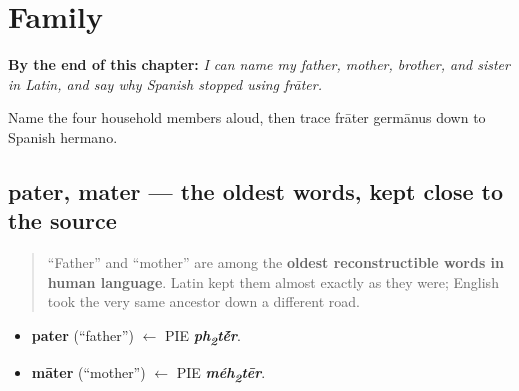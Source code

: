 
\chapter{Family}
\label{ch:la-family}

\begin{chapteropening}
\textbf{By the end of this chapter:} \emph{I can name my father, mother, brother, and sister in Latin, and say why Spanish stopped using frāter.}

Name the four household members aloud, then trace frāter germānus down to Spanish hermano.
\end{chapteropening}

\section[pater, mater]{pater, mater — the oldest words, kept close to the source}

\label{lesson:LA-C07-pater-mater}



\begin{quote}
\textquotedblleft{}Father\textquotedblright{} and \textquotedblleft{}mother\textquotedblright{} are among the \textbf{oldest reconstructible words in human language}. Latin kept them almost exactly as they were; English took the very same ancestor down a different road.
\end{quote}

\begin{cousinweb}
\begin{itemize}
\raggedright
  \item \textbf{pater} (\textquotedblleft{}father\textquotedblright{}) $\leftarrow$ PIE \emph{\textbf{ph\textsubscript{2}t\'{\={e}}r}}.
  \item \textbf{māter} (\textquotedblleft{}mother\textquotedblright{}) $\leftarrow$ PIE \emph{\textbf{méh\textsubscript{2}tēr}}.
\end{itemize}
\end{cousinweb}

